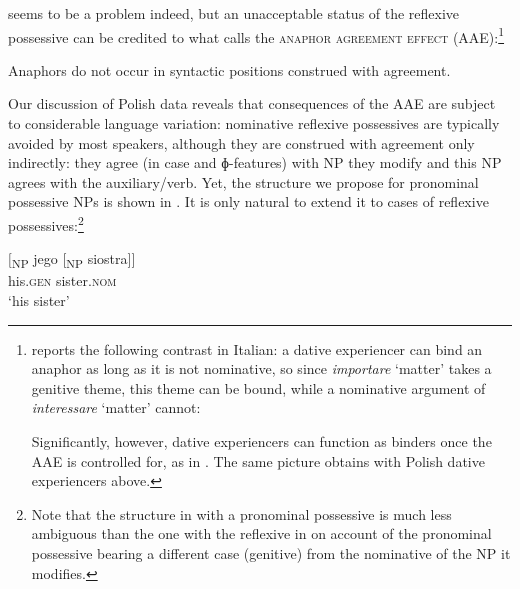 \documentclass[output=paper,modfonts,nonflat
]{langsci/langscibook}
\begin{document}
 seems to be a problem indeed, but an unacceptable status of the reflexive possessive can be credited to what \cite[26]{rizzi1990} calls the \textsc{anaphor agreement effect} (AAE):\footnote{\cite[32--33]{rizzi1990} reports the following contrast in Italian: a dative experiencer can bind an anaphor as long as it is not nominative, so since \textit{importare} ‘matter’ takes a genitive theme, this theme can be bound, while a nominative argument of \textit{interessare} ‘matter’ cannot:

\z

\z
                        
\noindent Significantly, however, dative experiencers can function as binders once the AAE is controlled for, as in . The same picture obtains with Polish dative experiencers above.}

\ea \label{ex:witkos:53}
Anaphors do not occur in syntactic positions construed with agreement.\\
\z


Our discussion of Polish data reveals that consequences of the AAE are subject to considerable language variation: nominative reflexive possessives are typically avoided by most speakers, although they are construed with agreement only indirectly: they agree (in case and ɸ-features) with NP they modify and this NP agrees with the auxiliary/verb. Yet, the structure we propose for pronominal possessive NPs is shown in . It is only natural to extend it to cases of reflexive possessives:\footnote{\label{fn29}Note that the structure in  with a pronominal possessive is much less ambiguous than the one with the reflexive in  on account of the pronominal possessive bearing a different case (genitive) from the nominative of the NP it modifies.} 

\ea \label{ex:witkos:57}{
\gll $[$\textsubscript{NP} jego [\textsubscript{NP}  siostra$]]$\\
     {} his.\textsc{gen} {} sister.\textsc{nom}\\
\glt `his sister'
}
\z
\end{document}
